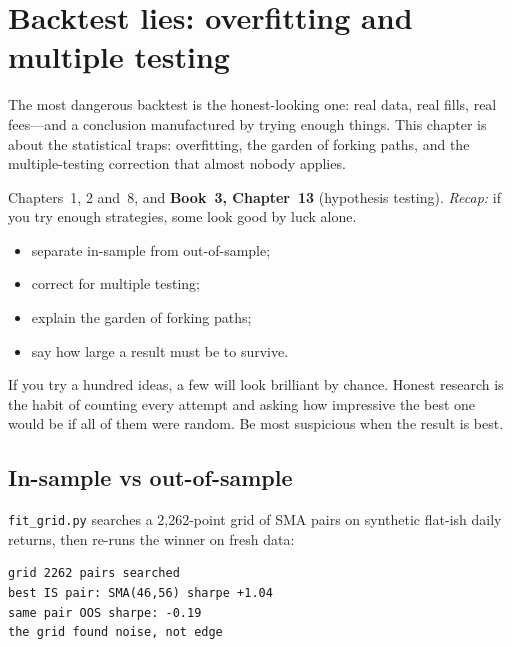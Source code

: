 \chapter{Backtest lies: overfitting and multiple testing}\label{ch:lies}

\noindent The most dangerous backtest is the honest-looking one: real data, real fills, real
fees---and a conclusion manufactured by trying enough things. This chapter is about the
statistical traps: overfitting, the garden of forking paths, and the multiple-testing
correction that almost nobody applies.

\begin{rulebox}
Chapters~1, 2 and~8, and \textbf{Book~3, Chapter~13} (hypothesis testing). \emph{Recap:} if you try enough strategies, some look good by luck alone.
\end{rulebox}
\begin{wins}
\begin{itemize}
\item separate in-sample from out-of-sample;
\item correct for multiple testing;
\item explain the garden of forking paths;
\item say how large a result must be to survive.
\end{itemize}
\end{wins}
\begin{principle}
If you try a hundred ideas, a few will look brilliant by chance. Honest research is the habit of counting every attempt and asking how impressive the best one would be if all of them were random. Be most suspicious when the result is best.
\end{principle}

\section{In-sample vs out-of-sample}\label{sec:isoos}

\texttt{fit\_grid.py} searches a 2{,}262-point grid of SMA pairs on synthetic flat-ish daily
returns, then re-runs the winner on fresh data:
\begin{lstlisting}[numbers=none]
grid 2262 pairs searched
best IS pair: SMA(46,56) sharpe +1.04
same pair OOS sharpe: -0.19
the grid found noise, not edge
\end{lstlisting}

